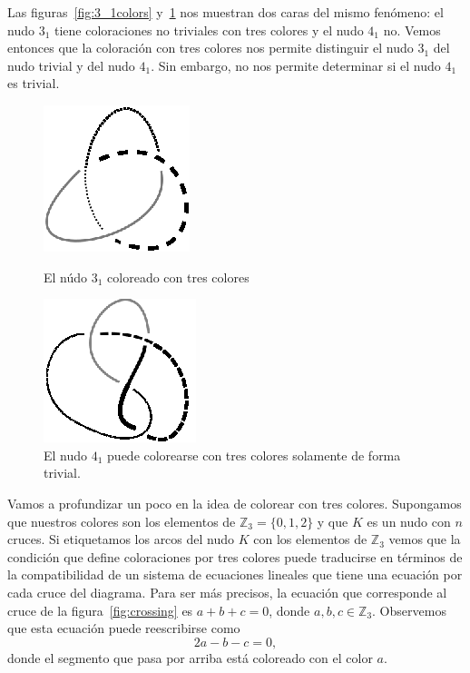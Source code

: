 \documentclass[graybox]{svmult}
\newcommand{\Z}{\mathbb{Z}}
\begin{document}
\begin{example}
    \label{exa:3colors}
    Las figuras~\ref{fig:3_1colors} 
	y~\ref{fig:4_1colors} nos muestran dos caras del mismo fenómeno: el nudo
	$3_1$ tiene coloraciones no triviales con tres colores y el nudo $4_1$ no.
	Vemos entonces que la coloración con tres colores nos permite distinguir el
	nudo $3_1$ del nudo trivial y del nudo $4_1$. Sin embargo, no nos permite
	determinar si el nudo $4_1$ es trivial. 
	\begin{figure}[ht]
		\begin{minipage}{0.45\textwidth}
			\centering
			\includegraphics[scale=0.6]{images/3_1colors}
			\caption{El núdo $3_1$ coloreado con tres colores}
			\label{fig:3_1colors}
		\end{minipage}
		\begin{minipage}{0.45\textwidth}
			\centering
			\includegraphics[scale=0.6]{images/4_1colors}
			\caption{El nudo $4_1$ puede colorearse con tres colores solamente de forma trivial.}
			\label{fig:4_1colors}
		\end{minipage}
	\end{figure}
\end{example}

Vamos a profundizar un poco en la idea de colorear con tres colores.
Supongamos que nuestros colores son los elementos de $\Z_3=\{0,1,2\}$ y que
$K$ es un nudo con $n$ cruces. Si etiquetamos los arcos del nudo $K$ con
los elementos de $\Z_3$ vemos que la condición que define coloraciones por
tres colores puede traducirse en términos de la compatibilidad de un
sistema de ecuaciones lineales que tiene una ecuación por cada cruce del
diagrama.  Para ser más precisos, la ecuación que corresponde al cruce de
la figura~\ref{fig:crossing} es $a+b+c=0$, donde $a,b,c\in\Z_3$.
Observemos que esta ecuación puede reescribirse como 
\begin{equation} 
	\label{eq:3colors}
	2a-b-c=0,
\end{equation}
donde el segmento que pasa por arriba está coloreado con el color $a$. 
\end{document}
